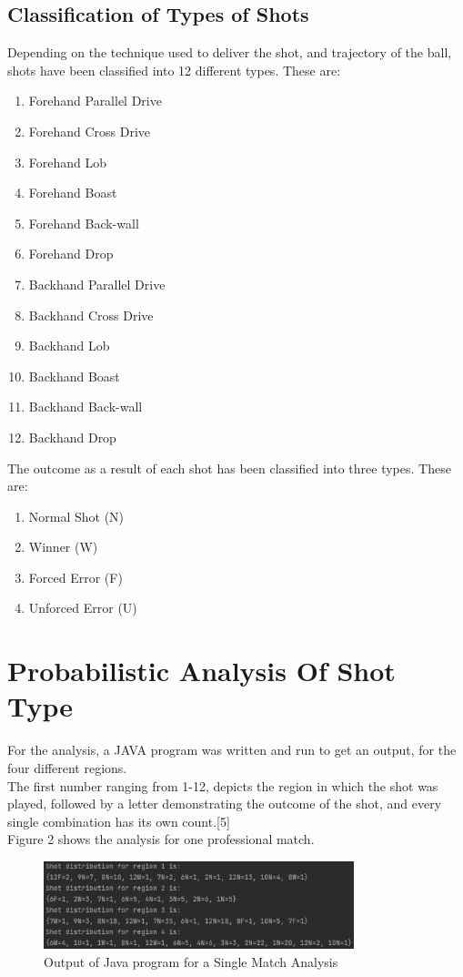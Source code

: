 \documentclass[10pt,conference]{IEEEtran}
\begin{document}
\subsection{Classification of Types of Shots}

Depending on the technique used to deliver the shot, and trajectory of the ball, shots have been classified into 12 different types. These are:
\begin{enumerate}
    \item Forehand Parallel Drive 
    \item Forehand Cross Drive 
    \item Forehand Lob 
    \item Forehand Boast 
    \item Forehand Back-wall
    \item Forehand Drop
    \item Backhand Parallel Drive
    \item Backhand Cross Drive
    \item Backhand Lob
    \item Backhand Boast 
    \item Backhand Back-wall 
    \item Backhand Drop
\end{enumerate}
The outcome as a result of each shot has been classified into three types. These are:
\begin{enumerate}
    \item Normal Shot (N)
    \item Winner (W)
    \item Forced Error (F)
    \item Unforced Error (U)
\end{enumerate}

\section{Probabilistic Analysis Of Shot Type}
\label{sec:sim_res}
For the analysis, a JAVA program was written and run to get an output, for the four different regions.\\ The first number ranging from 1-12, depicts the region in which the shot was played, followed by a letter demonstrating the outcome of the shot, and every single combination has its own count.[5]
\\Figure 2 shows the analysis for one professional match. 
\begin{figure}[h!]
\centering
\includegraphics[height=1.0in]{analysis.eps}
\caption{Output of Java program for a Single Match Analysis}
\label{fig:java_snip}
\end{figure}
\end{document}
